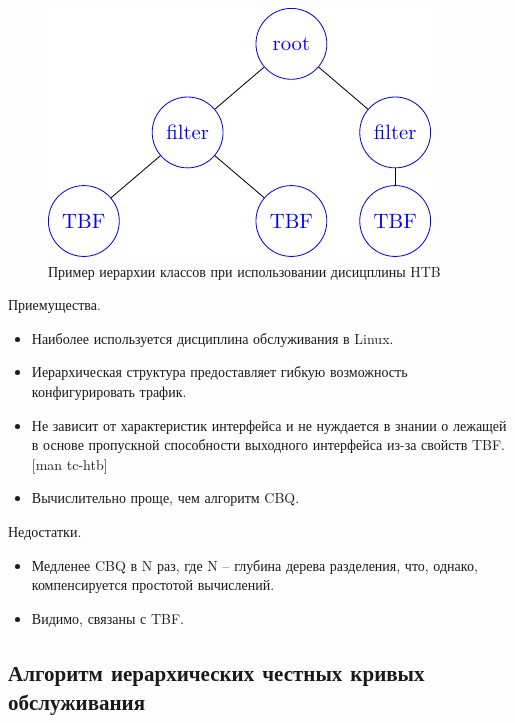         \begin{figure}[ht!]
            \center
            \includegraphics{./pdfimages/class_hierh_htb.pdf}
            \caption{Пример иерархии классов при использовании дисицплины HTB}
        \end{figure}


        Приемущества.
        \begin{itemize}
            \item Наиболее используется дисциплина обслуживания в Linux.
            \item Иерархическая структура предоставляет гибкую возможность конфигурировать трафик.
            \item Не зависит от характеристик интерфейса и не нуждается в знании о лежащей в
                  основе пропускной способности выходного интерфейса из-за свойств TBF. [man tc-htb]
            \item Вычислительно проще, чем алгоритм CBQ.
        \end{itemize}

        Недостатки.
        \begin{itemize}
            \item Медленее CBQ в N раз, где N -- глубина дерева разделения, что, однако, компенсируется простотой вычислений. 
            \item Видимо, связаны с TBF.
        \end{itemize}

    \subsection{Алгоритм иерархических честных кривых обслуживания}

